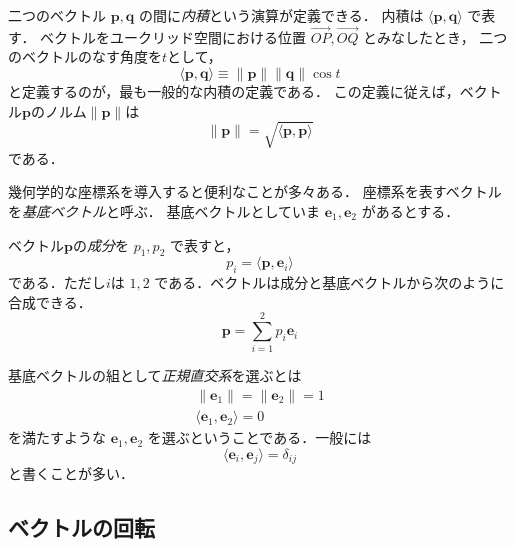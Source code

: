 \documentclass{jsbook}
\newcommand{\keyword}[1]{\emph{#1}}
\newcommand{\bvec}[1]{\boldsymbol{#1}}
\newcommand{\norm}[1]{\|{#1}\|}
\newcommand{\ve}{\bvec{e}}
\begin{document}
二つのベクトル $\bvec{p},\bvec{q}$ の間に\keyword{内積}という演算が定義できる．
内積は $\langle\bvec{p},\bvec{q}\rangle$ で表す．
ベクトルをユークリッド空間における位置 $\overrightarrow{OP},\overrightarrow{OQ}$ とみなしたとき，
二つのベクトルのなす角度を$t$として，
\begin{equation}
\langle\bvec{p},\bvec{q}\rangle\equiv\norm{\bvec{p}}\norm{\bvec{q}}\cos t
\end{equation}
と定義するのが，最も一般的な内積の定義である．
この定義に従えば，ベクトル$\bvec{p}$のノルム$\norm{\bvec{p}}$は
\begin{equation}
\norm{\bvec{p}}=\sqrt{\langle\bvec{p},\bvec{p}\rangle}
\end{equation}
である．

幾何学的な座標系を導入すると便利なことが多々ある．
座標系を表すベクトルを\keyword{基底ベクトル}と呼ぶ．
基底ベクトルとしていま $\ve_1,\ve_2$ があるとする．

ベクトル$\bvec{p}$の\keyword{成分}を $p_1,p_2$ で表すと，
\begin{equation}
p_i=\langle\bvec{p},\ve_i\rangle
\end{equation}
である．ただし$i$は $1,2$ である．ベクトルは成分と基底ベクトルから次のように合成できる．
\begin{equation}
\bvec{p}=\sum_{i=1}^2p_i\ve_i
\end{equation}

基底ベクトルの組として\keyword{正規直交系}を選ぶとは
\begin{gather}
\norm{\ve_1}=\norm{\ve_2}=1\\
\langle\ve_1,\ve_2\rangle=0
\end{gather}
を満たすような $\ve_1,\ve_2$ を選ぶということである．一般には
\begin{equation}
\langle\ve_i,\ve_j\rangle=\delta_{ij}
\end{equation}
と書くことが多い．

\subsection{ベクトルの回転}
\end{document}
